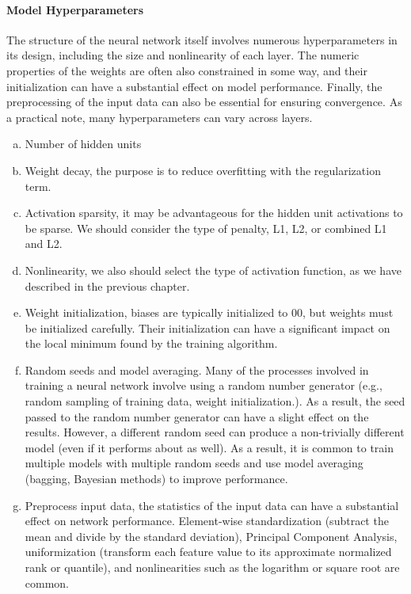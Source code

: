 \documentclass{article}
\begin{document}
\paragraph{Model Hyperparameters}
The structure of the neural network itself involves numerous hyperparameters in its design, including the size and nonlinearity of each layer. The numeric properties of the weights are often also constrained in some way, and their initialization can have a substantial effect on model performance. Finally, the preprocessing of the input data can also be essential for ensuring convergence. As a practical note, many hyperparameters can vary across layers.
\begin{enumerate}[(a)]
	\item Number of hidden units
	\item Weight decay, the purpose is to reduce overfitting with the regularization term.
	\item Activation sparsity, it may be advantageous for the hidden unit activations to be sparse. We should consider the type of penalty, L1, L2, or combined L1 and L2.
	\item Nonlinearity, we also should select the type of activation function, as we have described in the previous chapter.
	\item Weight initialization, biases are typically initialized to 00, but weights must be initialized carefully. Their initialization can have a significant impact on the local minimum found by the training algorithm.
	\item Random seeds \citep{DBLP:journals/corr/abs-1806-08295} and model averaging. Many of the processes involved in training a neural network involve using a random number generator (e.g., random sampling of training data, weight initialization.). As a result, the seed passed to the random number generator can have a slight effect on the results. However, a different random seed can produce a non-trivially different model (even if it performs about as well). As a result, it is common to train multiple models with multiple random seeds and use model averaging (bagging, Bayesian methods) to improve performance.
	\item Preprocess input data, the statistics of the input data can have a substantial effect on network performance. Element-wise standardization (subtract the mean and divide by the standard deviation), Principal Component Analysis, uniformization (transform each feature value to its approximate normalized rank or quantile), and nonlinearities such as the logarithm or square root are common.
\end{enumerate}
\end{document}
